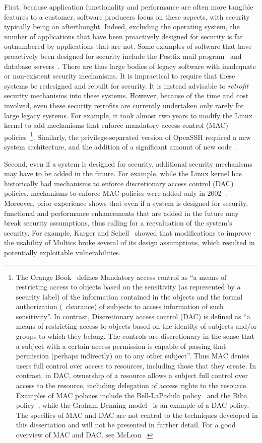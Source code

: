 First, because application functionality and performance are often more
tangible features to a customer, software producers focus on these aspects,
with security typically being an afterthought. Indeed, excluding the operating
system, the number of applications that have been proactively designed for
security is far outnumbered by applications that are not. Some examples of
software that have proactively been designed for security include the Postfix
mail program~\cite{postfix} and database servers~\cite{oracle,sqlserver}.
There are thus large bodies of legacy software with inadequate or non-existent
security mechanisms. It is impractical to require that these systems be
redesigned and rebuilt for security. It is instead advisable to
\textit{retrofit} security mechanisms into these systems. However, because of
the time and cost involved, even these security retrofits are currently
undertaken only rarely for large legacy systems.  For example, it took almost
two years to modify the Linux kernel to add mechanisms that enforce mandatory
access control (MAC) policies~\footnote{The Orange Book~\cite{tcsec} defines
Mandatory access control as ``a means of restricting access to objects based on
the sensitivity (as represented by a security label) of the information
contained in the objects and the formal authorization (\ie~clearance) of
subjects to access information of such sensitivity''. In contrast,
Discretionary access control (DAC) is defined as ``a means of restricting
access to objects based on the identity of subjects and/or groups to which they
belong. The controls are discretionary in the sense that a subject with a
certain access permission is capable of passing that permission (perhaps
indirectly) on to any other subject''. Thus MAC denies users full control over
access to resources, including those that they create. In contrast, in DAC,
ownership of a resource allows a subject full control over access to the
resource, including delegation of access rights to the resource.  Examples of
MAC policies include the Bell-LaPadula policy~\cite{bl76} and the Biba
policy~\cite{b77}, while the Graham-Denning model~\cite{gd72} is an example of
a DAC policy. The specifics of MAC and DAC are not central to the techniques
developed in this dissertation and will not be presented in further detail.
For a good overview of MAC and DAC, see McLean~\cite{m90}.}.
Similarly, the privilege-separated version of OpenSSH required a new system
architecture, and the addition of a significant amount of new
code~\cite{pfh03}.

Second, even if a system is designed for security, additional security
mechanisms may have to be added in the future. For example, while the Linux
kernel has historically had mechanisms to enforce discretionary access control
(DAC) policies, mechanisms to enforce MAC policies were added only in
2002~\cite{wcs+02}. Moreover, prior experience shows that even if a system is
designed for security, functional and performance enhancements that are added
in the future may break security assumptions, thus calling for a reevaluation
of the system's security. For example, Karger and Schell~\cite{ks74} showed
that modifications to improve the usability of Multics broke several of its
design assumptions, which resulted in potentially exploitable vulnerabilities.

